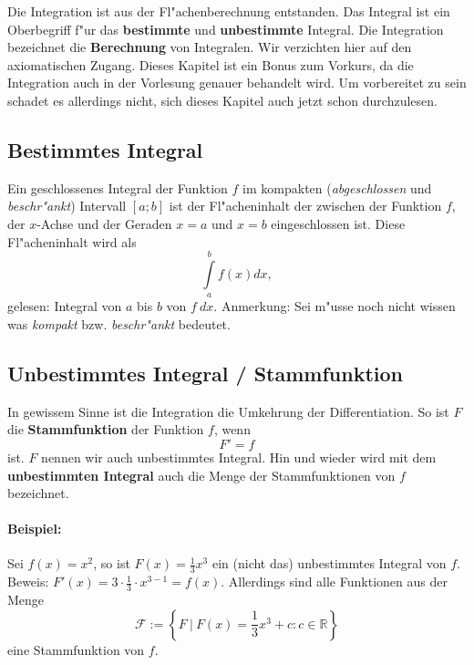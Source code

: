 Die Integration ist aus der Fl"achenberechnung entstanden. Das Integral ist ein Oberbegriff f"ur das \textbf{bestimmte} und \textbf{unbestimmte} Integral. Die Integration bezeichnet die \textbf{Berechnung} von Integralen. Wir verzichten hier auf den axiomatischen Zugang. Dieses Kapitel ist ein Bonus zum Vorkurs, da die Integration auch in der Vorlesung genauer behandelt wird. Um vorbereitet zu sein schadet es allerdings nicht, sich dieses Kapitel auch jetzt schon durchzulesen.

\subsection{Bestimmtes Integral}
Ein geschlossenes Integral der Funktion $f$ im kompakten (\textit{abgeschlossen} und \textit{beschr"ankt}) Intervall $\left[ a; b \right]$ ist der Fl"acheninhalt der zwischen der Funktion $f$, der $x$-Achse und der Geraden $x = a$ und $x = b$ eingeschlossen ist. Diese Fl"acheninhalt wird als 
\begin{equation*}
\int\limits_a^b f(x) dx,
\end{equation*}
gelesen: Integral von $a$ bis $b$ von $f \ dx$. Anmerkung: Sei m"usse noch nicht wissen was \textit{kompakt} bzw. \textit{beschr"ankt} bedeutet.

\subsection{Unbestimmtes Integral / Stammfunktion}
In gewissem Sinne ist die Integration die Umkehrung der Differentiation. So ist $F$ die \textbf{Stammfunktion} der Funktion $f$, wenn
\begin{equation*}
F' = f
\end{equation*}
ist. $F$ nennen wir auch unbestimmtes Integral. Hin und wieder wird mit dem \textbf{unbestimmten Integral} auch die Menge der Stammfunktionen von $f$ bezeichnet.
\paragraph{Beispiel:} Sei $f(x) = x^2$, so ist $F(x) = \frac{1}{3} x^3$ ein (nicht das) unbestimmtes Integral von $f$. Beweis: $F'(x) = 3 \cdot \frac{1}{3} \cdot x^{3-1} = f(x)$. Allerdings sind alle Funktionen aus der Menge 
\begin{equation*}
\mathcal{F} := \left\{ F \ | \ F(x) = \frac{1}{3} x^3 + c : c \in \mathbb{R} \right\}
\end{equation*}
eine Stammfunktion von $f$.

